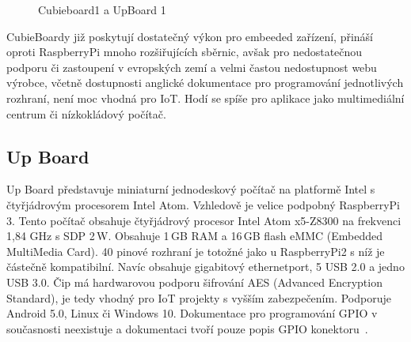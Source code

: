 	\begin{figure}[!ht]
	\vspace{-10pt}	
    \centering
			\hspace*{5mm}
			\caption{Cubieboard1 a UpBoard 1}
			\vspace{-10pt}	
\end{figure}
		

CubieBoardy již poskytují dostatečný výkon pro embeeded zařízení, přináší oproti RaspberryPi mnoho rozšiřujících sběrnic, avšak pro nedostatečnou podporu či zastoupení v evropských zemí a velmi častou nedostupnost webu výrobce, včetně dostupnosti anglické dokumentace pro  programování jednotlivých rozhraní, není moc vhodná pro IoT. Hodí se spíše pro aplikace jako multimediální centrum či nízkokládový počítač. 	


\subsection{Up Board}
		Up Board představuje miniaturní jednodeskový počítač na platformě Intel s čtyřjádrovým procesorem Intel Atom. Vzhledově je velice podpobný RaspberryPi 3. 
		Tento počítač obsahuje čtyřjádrový procesor Intel Atom x5-Z8300 na frekvenci 1,84 GHz s SDP 2\,W. Obsahuje 1\,GB RAM a 16\,GB flash eMMC (Embedded MultiMedia Card). 40 pinové rozhraní je totožné jako u RaspberryPi2 s níž je částečně kompatibilní. Navíc obsahuje gigabitový ethernetport, 5 USB 2.0 a jedno USB 3.0. Čip má hardwarovou podporu šifrování AES (Advanced Encryption Standard), je tedy vhodný pro IoT projekty s vyšším zabezpečením. Podporuje Android 5.0, Linux či Windows 10. Dokumentace pro programování GPIO v současnosti neexistuje a dokumentaci tvoří pouze popis GPIO konektoru~\cite{UpBoard}.

